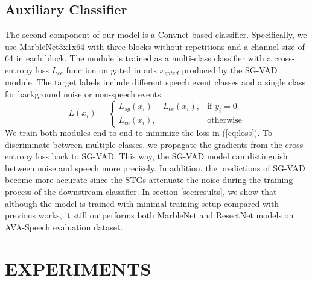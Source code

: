 \documentclass{article}
\begin{document}
\subsection{Auxiliary Classifier}
\label{sec:aclass}
The second component of our model is a Convnet-based classifier. Specifically, we use MarbleNet3x1x64 \cite{jia2021marblenet} with three blocks without repetitions and a channel size of 64 in each block. The module is trained as a multi-class classifier with a cross-entropy loss $L_{ce}$ function on gated inputs $x_{gated}$ produced by the SG-VAD module. The target labels include different speech event classes and a single class for background noise or non-speech events.
 \begin{equation}\label{eq:loss}
L(x_i) = \begin{cases}
        L_{sg}(x_i) + L_{ce}(x_i), & \text{if  $y_i=0$}\\
        L_{ce}(x_i), & \text{otherwise}
    \end{cases}
\end{equation}
We train both modules end-to-end to minimize the loss in (\ref{eq:loss}). To discriminate between multiple classes, we propagate the gradients from the cross-entropy loss back to SG-VAD. This way, the SG-VAD model can distinguish between noise and speech more precisely. In addition, the predictions of SG-VAD become more accurate since the STGs attenuate the noise during the training process of the downstream classifier. In section \ref{sec:results}, we show that although the model is trained with minimal training setup compared with previous works, it still outperforms both MarbleNet \cite{jia2021marblenet} and ResectNet \cite{kopuklu2022resectnet} models on AVA-Speech \cite{chaudhuri2018ava} evaluation dataset.

\section{EXPERIMENTS}
\label{sec:exps}
\end{document}

